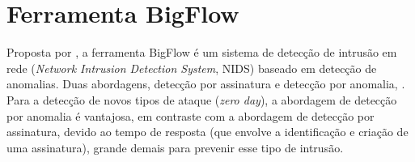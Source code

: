 \begin{table}[ht]
\begin{scriptsize}
\begin{tabularx}{\linewidth}{X|X|X|X|X}
  \end{tabularx}
  \label{tab:summary}
  \end{scriptsize}
\end{table}


\section{Ferramenta BigFlow}

Proposta por , a ferramenta BigFlow é um sistema de
detecção de intrusão em rede (\emph{Network Intrusion Detection System}, NIDS)
baseado em detecção de anomalias.
Duas abordagens, detecção por assinatura e detecção por anomalia, 
.
Para a detecção de novos tipos de ataque (\emph{zero day}), a abordagem de
detecção por anomalia é vantajosa, em contraste com a abordagem de detecção por
assinatura, devido ao tempo de resposta (que envolve a identificação e criação de
uma assinatura), grande demais para prevenir esse tipo de intrusão.

